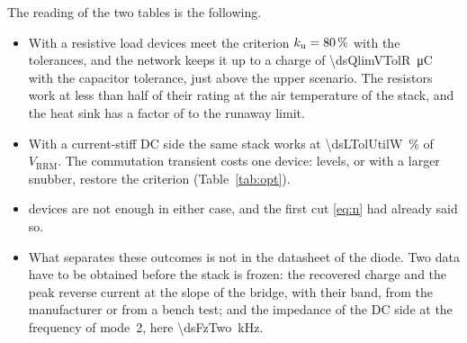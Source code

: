 \documentclass[10pt,a4paper]{scrartcl}
\newcommand{\Vrrm}{V_\mathrm{RRM}}
\newcommand{\ku}{k_\mathrm{u}}
\begin{document}
The reading of the two tables is the following.
\begin{itemize}
\item With a resistive load \dsNword{} devices meet the criterion $\ku = \dsKu\,\%$ with the tolerances, and the network keeps it up to a charge of \SI{\dsQlimVTolR}{\micro\coulomb} with the capacitor tolerance, just above the upper scenario. The resistors work at less than half of their rating at the air temperature of the stack, and the heat sink has a factor of \dsRhaRRatio{} to the runaway limit.
\item With a current-stiff DC side the same stack works at \SI{\dsLTolUtilW}{\percent} of $\Vrrm$. The commutation transient costs one device: \dsNplusWord{} levels, or \dsNword{} with a larger snubber, restore the criterion (Table~\ref{tab:opt}).
\item \dsNminusWordCap{} devices are not enough in either case, and the first cut \eqref{eq:n} had already said so.
\item What separates these outcomes is not in the datasheet of the diode. Two data have to be obtained before the stack is frozen: the recovered charge and the peak reverse current at the slope of the bridge, with their band, from the manufacturer or from a bench test; and the impedance of the DC side at the frequency of mode~2, here \SI{\dsFzTwo}{\kilo\hertz}.
\end{itemize}

\end{document}
